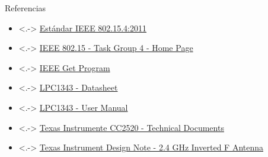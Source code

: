 \documentclass[aspectratio=169]{beamer}
\begin{document}
\begin{frame}[c]{Referencias}

\vspace{20px}
\begin{itemize}
	\item<.-> \href{http://ecee.colorado.edu/~liue/teaching/comm_standards/2015S_zigbee/802.15.4-2011.pdf}{Estándar IEEE 802.15.4:2011}
	\vspace{5px}	
	\item<.-> \href{http://www.ieee802.org/15/pub/TG4.html}{IEEE 802.15 - Task Group 4 - Home Page}
	\vspace{5px}
	\item<.-> \href{	https://standards.ieee.org/about/get/802/802.15.html}{IEEE Get Program}
	\vspace{5px}
	\item<.-> \href{http://www.nxp.com/documents/data_sheet/LPC1311_13_42_43.pdf}{LPC1343 - Datasheet}
	\vspace{5px}
	\item<.-> \href{http://www.nxp.com/documents/user_manual/UM10375.pdf}{LPC1343 - User Manual}
	\vspace{5px}
	\item<.-> \href{http://www.ti.com/product/CC2520/technicaldocuments}{Texas Instrumente CC2520 -  Technical Documents}
	\vspace{5px}
	\item<.-> \href{http://www.ti.com/lit/an/swru120b/swru120b.pdf}{Texas Instrument Design Note - 2.4 GHz Inverted F Antenna}
\end{itemize}
\end{frame}

\end{document}

